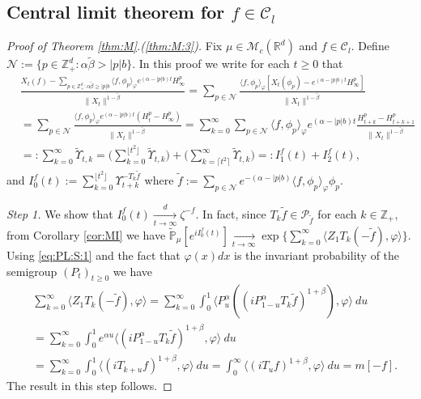 \documentclass[12pt,a4paper]{amsart}
\theoremstyle{plain}
\theoremstyle{definition}
\numberwithin{equation}{section}
\begin{document}
\subsection{Central limit theorem for $f\in \mathcal C_l$}
\label{sec: large rate clt}
\begin{proof}[Proof of Theorem \ref{thm:M}.(\ref{thm:M:3})]
  Fix $\mu \in \mathcal M_c(\mathbb R^d)$ and $f \in \mathcal C_l$.
  Define $\mathcal N:= \{p\in \mathbb Z_+^d: \alpha \tilde \beta > |p|b\}$.
  In this proof we write for each $t\geq 0$ that
  \begin{align}
    & \frac{X_t(f) - \sum_{p\in \mathbb Z_+^d: \alpha \tilde \beta \geq |p|b} \langle f,\phi_p\rangle_\varphi e^{(\alpha - |p|b)t}H_\infty^p}{\|X_t\|^{1- \tilde \beta}}
      = \sum_{p\in \mathcal N}\frac{ \langle f,\phi_p\rangle_\varphi [X_t(\phi_p) - e^{(\alpha - |p|b)t}H_\infty^p]}{\|X_t\|^{1- \tilde \beta}}
    \\& = \sum_{p \in \mathcal N} \frac{\langle f,\phi_p\rangle_\varphi e^{(\alpha - |p|b)t}(H_t^p - H_\infty^p)}{\|X_t\|^{1- \tilde \beta}}
    = \sum_{k=0}^\infty \sum_{p \in \mathcal N}  \langle f,\phi_p\rangle_\varphi e^{(\alpha - |p|b)t}\frac{ H_{t+k}^p - H_{t+k+1}^p}{\|X_t\|^{1- \tilde \beta}}
    \\ & =: \sum_{k=0}^\infty \widetilde \Upsilon_{t,k}
         = \Big(\sum_{k = 0}^{\lfloor t^2 \rfloor}  \widetilde \Upsilon_{t,k} \Big) + \Big(\sum_{k = \lceil t^2 \rceil}^\infty  \widetilde \Upsilon_{t,k}\Big)
         = : I^f_1(t) + I^f_2(t),
  \end{align}
  and $I^f_0(t):= \sum_{k = 0}^{\lfloor t^2 \rfloor} \Upsilon_{t+k}^{- T_k \tilde f}$ where $\tilde f := \sum_{p\in \mathcal N} e^{-(\alpha - |p|b)}\langle f, \phi_p \rangle_\varphi \phi_p$.

  \emph{Step 1.} We show that $I^f_0(t) \xrightarrow [t\to \infty]{d} \zeta^{-f}$.
  In fact, since $T_k\tilde f \in \mathcal P_{\tilde f}$ for each $k\in \mathbb Z_+$, from Corollary \ref{cor:MI} we have $\widetilde{ \mathbb P}_\mu[e^{i I_0^f(t)}]\xrightarrow[t\to \infty]{}\exp\{\sum_{k=0}^\infty \langle Z_1T_k(-\tilde f),\varphi\rangle\}$.
  Using \eqref{eq:PL:S:1} and the fact that $\varphi(x)dx$ is the invariant probability of the semigroup $(P_t)_{t\geq 0}$ we have
  \begin{align}
    \label{eq:PM:CLTS:2}
    & \sum_{k=0}^\infty \langle Z_1 T_{k} (-\tilde f), \varphi \rangle
      = \sum_{k=0}^\infty \int_0^1 \langle P_u^\alpha ((iP_{1 - u}^\alpha T_k \tilde f)^{1+\beta}), \varphi\rangle ~du
    \\& = \sum_{k=0}^\infty \int_0^1 e^{\alpha u} \langle  (iP_{1 - u}^\alpha T_{k}\tilde f)^{1+\beta}, \varphi \rangle ~du
    \\& = \sum_{k=0}^\infty \int_0^1 \langle  (iT_{k+ u} f)^{1+\beta}, \varphi\rangle~du
    = \int_0^\infty \langle  (iT_{u} f)^{1+\beta}, \varphi\rangle~du = m[-f].
  \end{align}
  The result in this step follows.


\end{proof}
\end{document}
